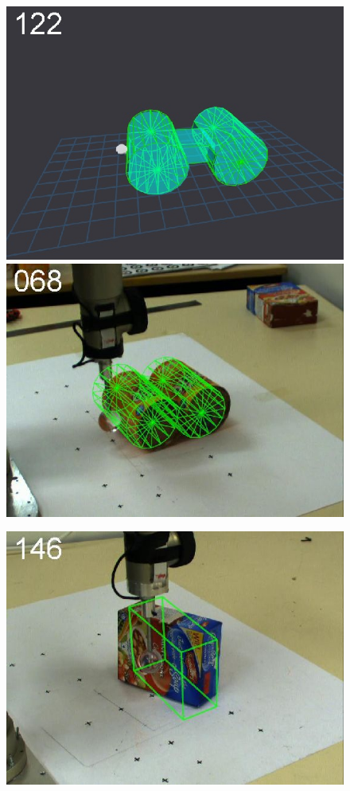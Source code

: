 \begin{figure}[t]
{\includegraphics[width=\imgCXwid]{./C5_3exp_6_2}
\includegraphics[width=\imgCXwid]{./C2_3exp_75_2}
}
\centerline{
\includegraphics[width=\imgCXwid]{./C1_2exp_87_3}
}
\end{figure}
